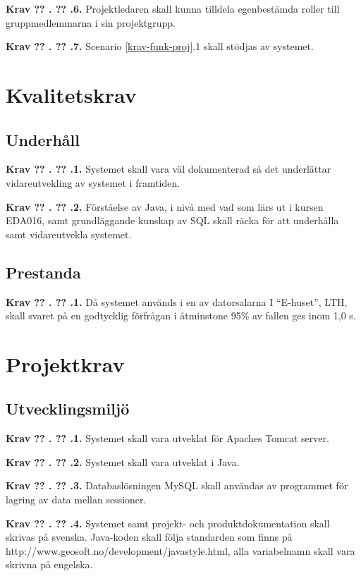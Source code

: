 \documentclass[a4paper]{article}
\newcommand\getcurrentref[1]{%
 \ifnumequal{\value{#1}}{0}
  {??}
  {\the\value{#1}}%
}
\newcommand\requirement[2]{
	\numberedrow{Krav}{#1}{#2}
}
\newcommand\numberedrow[3]{
	\noindent
	\textbf{#1 \getcurrentref{section}.\getcurrentref{subsection}.#2.} #3
	
}
\begin{document}

\requirement{6}{Projektledaren skall kunna tilldela egenbestämda roller till gruppmedlemmarna i sin projektgrupp.}
\requirement{7}{Scenario \ref{krav-funk-proj}.1 skall stödjas av systemet.}

\section{Kvalitetskrav}
\subsection{Underhåll}
\requirement{1}{Systemet skall vara väl dokumenterad så det underlättar vidareutvekling av systemet i framtiden.}
\requirement{2}{Förståelse av Java, i nivå med vad som lärs ut i kursen EDA016, samt grundläggande kunskap av SQL skall räcka för att underhålla samt vidareutvekla systemet.}
\subsection{Prestanda}
\requirement{1}{Då systemet används i en av datorsalarna I ``E-huset'', LTH, skall svaret på en godtycklig förfrågan i åtminstone 95\% av fallen ges inom 1,0 s.}
\section{Projektkrav}
\subsection{Utvecklingsmiljö}
\requirement{1}{Systemet skall vara utveklat för Apaches Tomcat server.}
\requirement{2}{Systemet skall vara utveklat i Java.}
\requirement{3}{Databaslösningen MySQL skall användas av programmet för lagring av data mellan sessioner.}
\requirement{4}{Systemet samt projekt- och produktdokumentation skall skrivas på svenska. Java-koden skall följa standarden som finns på http://www.geosoft.no/development/javastyle.html, alla variabelnamn skall vara skrivna på engelska.}
\end{document}
